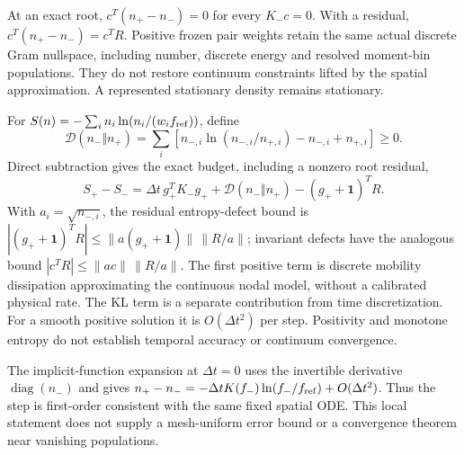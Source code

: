\documentclass[11pt,letterpaper]{article}
\begin{document}
At an exact root, $c^T(n_+-n_-)=0$ for every $K_-c=0$. With a residual,
$c^T(n_+-n_-)=c^TR$. Positive frozen pair weights retain the same actual
discrete Gram nullspace, including number, discrete energy and resolved
moment-bin populations. They do not restore continuum constraints lifted by
the spatial approximation. A represented stationary density remains stationary.

For $S(n)=-\sum_i n_i\ln(n_i/(w_i f_{\rm ref}))$, define
\begin{equation}
 \mathcal D(n_-\Vert n_+)=\sum_i
 [n_{-,i}\ln(n_{-,i}/n_{+,i})-n_{-,i}+n_{+,i}]\ge0.
\end{equation}
Direct subtraction gives the exact budget, including a nonzero root residual,
\begin{equation}
 S_+-S_- =\Delta t\,g_+^TK_-g_+
       +\mathcal D(n_-\Vert n_+) -(g_++\bm1)^TR.
 \label{eq:laggedentropybudget}
\end{equation}
With $a_i=\sqrt{n_{-,i}}$, the residual entropy-defect bound is
$|(g_++\bm1)^TR|\le\|a(g_++\bm1)\|\,\|R/a\|$; invariant defects have
the analogous bound $|c^TR|\le\|ac\|\,\|R/a\|$.
The first positive term is discrete mobility dissipation approximating the
continuous nodal model, without a calibrated physical rate. The KL term is a
separate contribution from time discretization. For a smooth positive
solution it is $O(\Delta t^2)$ per step. Positivity and monotone entropy do
not establish temporal accuracy or continuum convergence.

The implicit-function expansion at $\Delta t=0$ uses the invertible derivative
$\operatorname{diag}(n_-)$ and gives
$n_+-n_-=-\Delta t K(f_-)\ln(f_-/f_{\rm ref})+O(\Delta t^2)$.
Thus the step is first-order consistent with the same fixed spatial ODE.
This local statement does not supply a mesh-uniform error bound or a
convergence theorem near vanishing populations.
\end{document}
